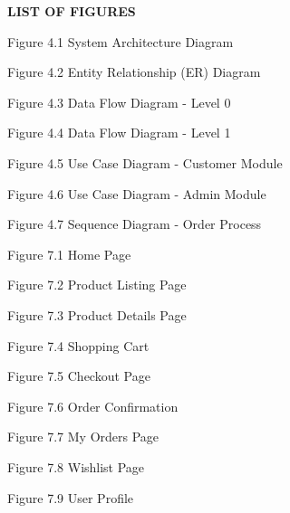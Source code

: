 \documentclass[12pt,a4paper]{report}
\begin{document}
\begin{center}
    \textbf{\Large LIST OF FIGURES}
\end{center}

\vspace{10pt}

\noindent Figure 4.1 \hspace{0.5em} System Architecture Diagram 

\noindent Figure 4.2 \hspace{0.5em} Entity Relationship (ER) Diagram 

\noindent Figure 4.3 \hspace{0.5em} Data Flow Diagram - Level 0 

\noindent Figure 4.4 \hspace{0.5em} Data Flow Diagram - Level 1 

\noindent Figure 4.5 \hspace{0.5em} Use Case Diagram - Customer Module 

\noindent Figure 4.6 \hspace{0.5em} Use Case Diagram - Admin Module 

\noindent Figure 4.7 \hspace{0.5em} Sequence Diagram - Order Process 

\noindent Figure 7.1 \hspace{0.5em} Home Page 

\noindent Figure 7.2 \hspace{0.5em} Product Listing Page 

\noindent Figure 7.3 \hspace{0.5em} Product Details Page 

\noindent Figure 7.4 \hspace{0.5em} Shopping Cart 

\noindent Figure 7.5 \hspace{0.5em} Checkout Page 

\noindent Figure 7.6 \hspace{0.5em} Order Confirmation 

\noindent Figure 7.7 \hspace{0.5em} My Orders Page 

\noindent Figure 7.8 \hspace{0.5em} Wishlist Page 

\noindent Figure 7.9 \hspace{0.5em} User Profile 
\end{document}
